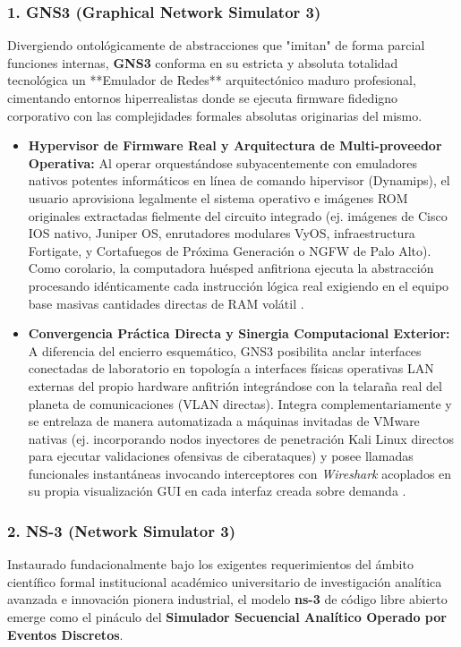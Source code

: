 \documentclass[a4paper,12pt]{article}
\begin{document}
\subsubsection*{1. GNS3 (Graphical Network Simulator 3)}
Divergiendo ontológicamente de abstracciones que "imitan" de forma parcial funciones internas, \textbf{GNS3} conforma en su estricta y absoluta totalidad tecnológica un **Emulador de Redes** arquitectónico maduro profesional, cimentando entornos hiperrealistas donde se ejecuta firmware fidedigno corporativo con las complejidades formales absolutas originarias del mismo.

\begin{itemize}
    \item \textbf{Hypervisor de Firmware Real y Arquitectura de Multi-proveedor Operativa:} Al operar orquestándose subyacentemente con emuladores nativos potentes informáticos en línea de comando hipervisor (Dynamips), el usuario aprovisiona legalmente el sistema operativo e imágenes ROM originales extractadas fielmente del circuito integrado (ej. imágenes de Cisco IOS nativo, Juniper OS, enrutadores modulares VyOS, infraestructura Fortigate, y Cortafuegos de Próxima Generación o NGFW de Palo Alto). Como corolario, la computadora huésped anfitriona ejecuta la abstracción procesando idénticamente cada instrucción lógica real exigiendo en el equipo base masivas cantidades directas de RAM volátil \cite{stallings2014}.
    \item \textbf{Convergencia Práctica Directa y Sinergia Computacional Exterior:} A diferencia del encierro esquemático, GNS3 posibilita anclar interfaces conectadas de laboratorio en topología a interfaces físicas operativas LAN externas del propio hardware anfitrión integrándose con la telaraña real del planeta de comunicaciones (VLAN directas). Integra complementariamente y se entrelaza de manera automatizada a máquinas invitadas de VMware nativas (ej. incorporando nodos inyectores de penetración Kali Linux directos para ejecutar validaciones ofensivas de ciberataques) y posee llamadas funcionales instantáneas invocando interceptores con \textit{Wireshark} acoplados en su propia visualización GUI en cada interfaz creada sobre demanda \cite{kurose2017}.
\end{itemize}

\subsubsection*{2. NS-3 (Network Simulator 3)}
Instaurado fundacionalmente bajo los exigentes requerimientos del ámbito científico formal institucional académico universitario de investigación analítica avanzada e innovación pionera industrial, el modelo \textbf{ns-3} de código libre abierto emerge como el pináculo del \textbf{Simulador Secuencial Analítico Operado por Eventos Discretos}.
\end{document}
